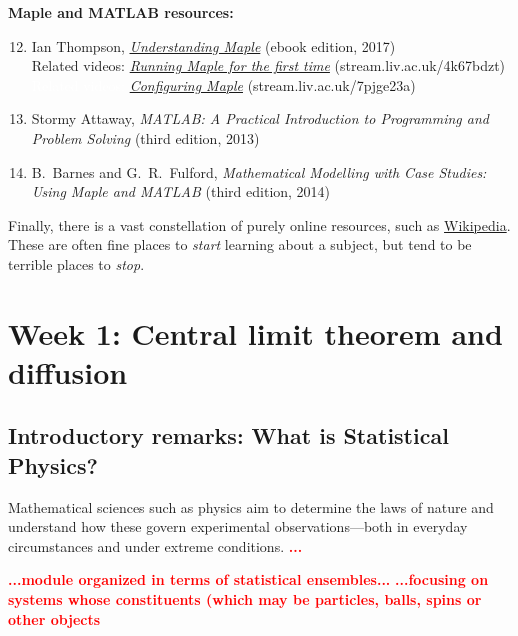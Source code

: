 \documentclass[12 pt]{article}
\newcommand{\TODO}[1]{\textcolor{red}{\textbf{#1}}}
\begin{document}
{\noindent\textbf{Maple and MATLAB resources:} \\[-24 pt]
\begin{enumerate}
  \setcounter{enumi}{11}
  \item Ian Thompson, \href{https://library.liv.ac.uk/record=b4395758~S8}{\textit{Understanding Maple}} (ebook edition, 2017) \\
        Related videos: \href{https://stream.liv.ac.uk/4k67bdzt}{\textit{Running Maple for the first time}} (stream.liv.ac.uk/4k67bdzt) \\
        \textcolor{white}{Related videos:} \href{https://stream.liv.ac.uk/7pjge23a}{\textit{Configuring Maple}} (stream.liv.ac.uk/7pjge23a)
  \item Stormy Attaway, \textit{MATLAB: A Practical Introduction to Programming and Problem Solving} (third edition, 2013)
  \item B.~Barnes and G.~R.~Fulford, \textit{Mathematical Modelling with Case Studies: Using Maple and MATLAB} (third edition, 2014)
\end{enumerate}

Finally, there is a vast constellation of purely online resources, such as \href{https://en.wikipedia.org/wiki/Statistical_physics}{Wikipedia}.
These are often fine places to \emph{start} learning about a subject, but tend to be terrible places to \emph{stop}.



\newpage
\setcounter{section}{1}
\section*{Week 1: Central limit theorem and diffusion}

\subsection*{Introductory remarks: What is Statistical Physics?}
Mathematical sciences such as physics aim to determine the laws of nature and understand how these govern experimental observations---both in everyday circumstances and under extreme conditions.
\TODO{...}

\TODO{...module organized in terms of statistical ensembles...}
\TODO{...focusing on systems whose constituents (which may be particles, balls, spins or other objects}



}
\end{document}
